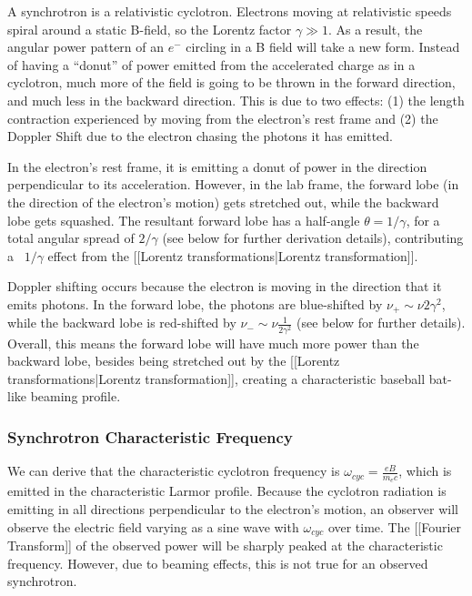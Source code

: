 \documentclass{article}
\begin{document}
A synchrotron is a relativistic cyclotron. Electrons moving at relativistic speeds spiral around a static B-field, so the Lorentz factor 
$\gamma\gg1$.  As a result, the angular power pattern of an $e^-$ circling in a B
field will take a new form.  Instead of having a ``donut'' of power emitted
from the accelerated charge as in a cyclotron, much more of the field is going to be thrown in
the forward direction, and much less in the backward direction.  This is due to two effects: (1) the length contraction experienced by moving from the electron's rest frame and (2) the Doppler Shift due to the electron chasing the photons it has emitted.

In the electron's rest frame, it is emitting a donut of power in the direction perpendicular to its acceleration. However, in the lab frame, the forward lobe (in the direction of the electron's motion) gets stretched out, while the backward lobe gets squashed. The resultant forward lobe has a half-angle $\theta = 1/\gamma$, for a total angular spread of $2/\gamma$ (see below for further derivation details), contributing a ~$1/\gamma$ effect from the [[Lorentz transformations|Lorentz transformation]].

Doppler shifting occurs because the electron is moving in the direction that it emits photons. In the forward lobe, the photons are blue-shifted by $\nu_+ \sim \nu 2\gamma^2$, while the backward lobe is red-shifted by $\nu_- \sim \nu \frac{1}{2\gamma^2}$ (see below for further details). Overall, this means the forward lobe will have much more power than the backward lobe, besides being stretched out by the [[Lorentz transformations|Lorentz transformation]], creating a characteristic baseball bat-like beaming profile.

\subsubsection{Synchrotron Characteristic Frequency}

We can derive that the characteristic cyclotron frequency is $\omega_{cyc} = \frac{eB}{ m_ec}$, which is emitted in the characteristic Larmor profile. Because the cyclotron radiation is emitting in all directions perpendicular to the electron's motion, an observer will observe the electric field varying as a sine wave with $\omega_{cyc}$ over time. The [[Fourier Transform]] of the observed power will be sharply peaked at the characteristic frequency. However, due to beaming effects, this is not true for an observed synchrotron.
\end{document}
